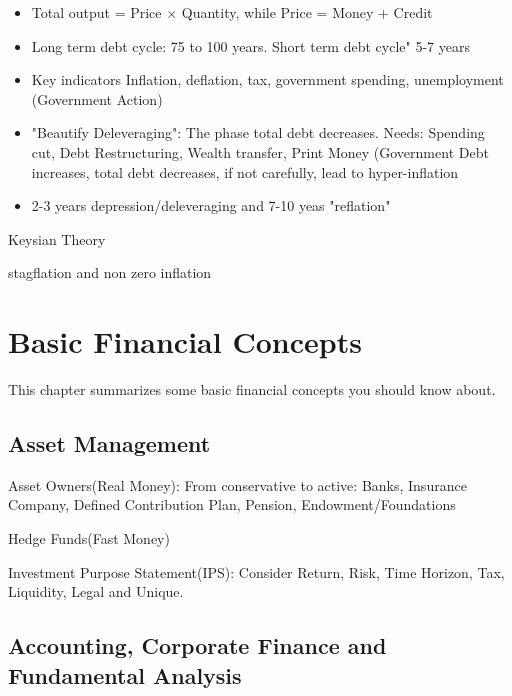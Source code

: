 \documentclass[11pt, openany]{book}              %
\begin{document}
\begin{itemize}
	\item Total output = Price $\times$ Quantity, while Price = Money + Credit
	\item Long term debt cycle: 75 to 100 years. Short term debt cycle" 5-7 years
	\item Key indicators Inflation, deflation, tax, government spending, unemployment (Government Action)
	\item "Beautify Deleveraging": The phase total debt decreases. Needs: Spending cut, Debt Restructuring, Wealth transfer, Print Money (Government Debt increases, total debt decreases, if not carefully, lead to hyper-inflation
	\item 2-3 years depression/deleveraging and 7-10 yeas "reflation"
\end{itemize}

Keysian Theory 

stagflation and non zero inflation




\chapter{Basic Financial Concepts}                %

This chapter summarizes some basic financial concepts you should know about.



\section{Asset Management}

Asset Owners(Real Money): From conservative to active: Banks, Insurance Company, Defined Contribution Plan, Pension, Endowment/Foundations 

Hedge Funds(Fast Money)

Investment Purpose Statement(IPS): Consider Return, Risk, Time Horizon, Tax, Liquidity, Legal and Unique. 

\section{Accounting, Corporate Finance and Fundamental Analysis}
\end{document}
